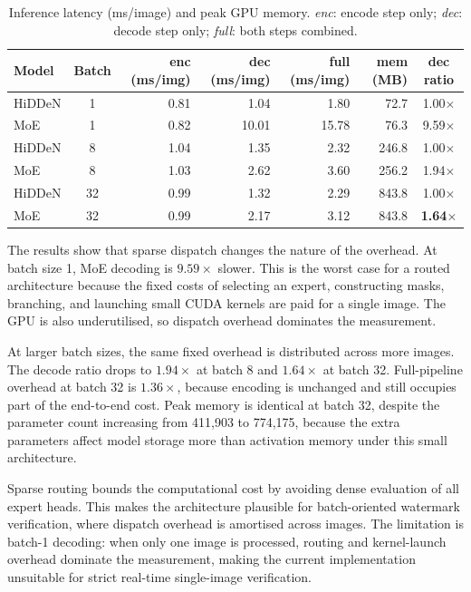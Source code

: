﻿\documentclass[12pt, a4paper, twoside]{report}
\numberwithin{equation}{chapter}
\begin{document}
\begin{table}[H]
\centering
\begin{tabular}{lcrrrrc}
\toprule
\textbf{Model} & \textbf{Batch} & \textbf{enc (ms/img)} & \textbf{dec (ms/img)} & \textbf{full (ms/img)} & \textbf{mem (MB)} & \textbf{dec ratio} \\
\midrule
HiDDeN & 1  & 0.81 & 1.04 & 1.80 & 72.7  & 1.00$\times$ \\
MoE    & 1  & 0.82 & 10.01 & 15.78 & 76.3 & 9.59$\times$ \\
\midrule
HiDDeN & 8  & 1.04 & 1.35 & 2.32 & 246.8  & 1.00$\times$ \\
MoE    & 8  & 1.03 & 2.62 & 3.60 & 256.2  & 1.94$\times$ \\
\midrule
HiDDeN & 32 & 0.99 & 1.32 & 2.29 & 843.8  & 1.00$\times$ \\
MoE    & 32 & 0.99 & 2.17 & 3.12 & 843.8  & \textbf{1.64$\times$} \\
\bottomrule
\end{tabular}
\caption{Inference latency (ms/image) and peak GPU memory. \textit{enc}: encode step only; \textit{dec}: decode step only; \textit{full}: both steps combined.}
\label{tab:moe-cost}
\end{table}

The results show that sparse dispatch changes the nature of the overhead. At batch size 1, MoE decoding is $9.59\times$ slower. This is the worst case for a routed architecture because the fixed costs of selecting an expert, constructing masks, branching, and launching small CUDA kernels are paid for a single image. The GPU is also underutilised, so dispatch overhead dominates the measurement.

At larger batch sizes, the same fixed overhead is distributed across more images. The decode ratio drops to $1.94\times$ at batch 8 and $1.64\times$ at batch 32. Full-pipeline overhead at batch 32 is $1.36\times$, because encoding is unchanged and still occupies part of the end-to-end cost. Peak memory is identical at batch 32, despite the parameter count increasing from 411{,}903 to 774{,}175, because the extra parameters affect model storage more than activation memory under this small architecture.

Sparse routing bounds the computational cost by avoiding dense evaluation of all expert heads. This makes the architecture plausible for batch-oriented watermark verification, where dispatch overhead is amortised across images. The limitation is batch-1 decoding: when only one image is processed, routing and kernel-launch overhead dominate the measurement, making the current implementation unsuitable for strict real-time single-image verification.
\end{document}
